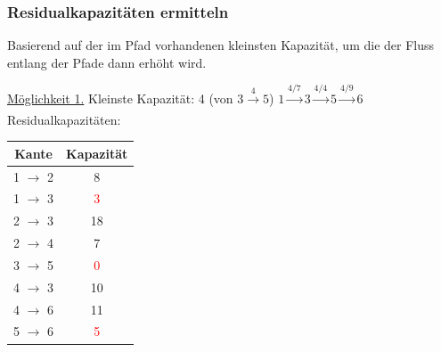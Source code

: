 \documentclass{article}
\begin{document}
\subsubsection*{Residualkapazitäten ermitteln} 
Basierend auf der im Pfad vorhandenen kleinsten Kapazität, um die der Fluss entlang der Pfade dann erhöht wird.  \newline \newline 
\begin{minipage}{8cm}
\underline{Möglichkeit 1.} \newline
Kleinste Kapazität: 4 (von $3 \xrightarrow[]{4} 5$) \newline \newline
$ 1 \xrightarrow[]{4/7} 3 \xrightarrow[]{4/4} 5 \xrightarrow[]{4/9} 6$ \newline
Residualkapazitäten: 
\begin{table}[H]
    \centering
    \begin{tabular}{c|c}
        \textbf{Kante} & \textbf{Kapazität}  \\ \hline
        1 $\rightarrow$ 2 & 8 \\
        1 $\rightarrow$ 3 & \textcolor{red}{3} \\
        2 $\rightarrow$ 3 & 18 \\
        2 $\rightarrow$ 4 & 7 \\
        3 $\rightarrow$ 5 & \textcolor{red}{0} \\
        4 $\rightarrow$ 3 & 10 \\
        4 $\rightarrow$ 6 & 11\\
        5 $\rightarrow$ 6 & \textcolor{red}{5} \\
    \end{tabular}
    \label{tab:res1}
\end{table}
\end{minipage}
\begin{minipage}{1cm}
$\ $
\end{minipage}
\end{document}
